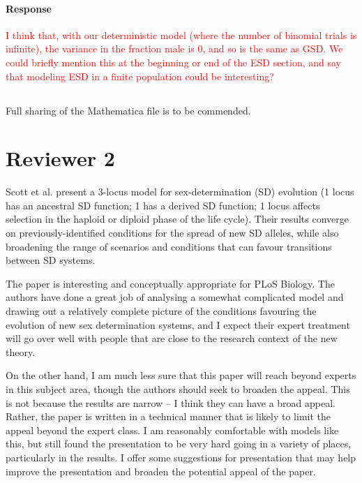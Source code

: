 \documentclass[10pt,letterpaper]{article}
\begin{document}
\noindent\paragraph{Response}
\textcolor{red}{I think that, with our deterministic model (where the number of binomial trials is infinite), the variance in the fraction male is 0, and so is the same as GSD. We could briefly mention this at the beginning or end of the ESD section, and say that modeling ESD in a finite population could be interesting?}

\noindent\subsection{}
Full sharing of the Mathematica file is to be commended.

\section{Reviewer 2}

Scott et al. present a 3-locus model for sex-determination (SD) evolution (1 locus has an ancestral SD function; 1 has a derived SD function; 1 locus affects selection in the haploid or diploid phase of the life cycle). Their results converge on previously-identified conditions for the spread of new SD alleles, while also broadening the range of scenarios and conditions that can favour transitions between SD systems.

The paper is interesting and conceptually appropriate for PLoS Biology. The authors have done a great job of analysing a somewhat complicated model and drawing out a relatively complete picture of the conditions favouring the evolution of new sex determination systems, and I expect their expert treatment will go over well with people that are close to the research context of the new theory.

On the other hand, I am much less sure that this paper will reach beyond experts in this subject area, though the authors should seek to broaden the appeal. This is not because the results are narrow -- I think they can have a broad appeal. Rather, the paper is written in a technical manner that is likely to limit the appeal beyond the expert class. I am reasonably comfortable with models like this, but still found the presentation to be very hard going in a variety of places, particularly in the results. I offer some suggestions for presentation that may help improve the presentation and broaden the potential appeal of the paper.
\end{document}
